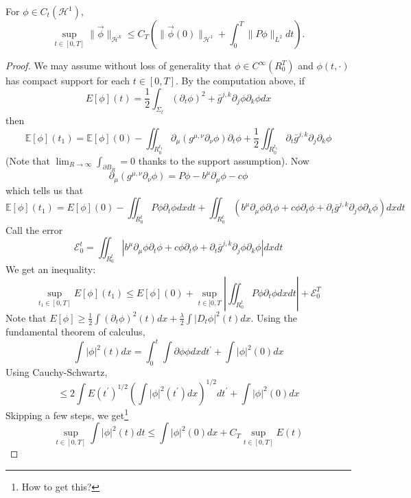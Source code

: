 \begin{lemma}
 For $\phi \in C_{t}\left(\mathcal{H}^{1}\right)$,
$$
\sup _{t \in[0, T]}\|\vec{\phi}\|_{\mathcal{H}^{k}} \leq C_{T}\left(\|\vec{\phi}(0)\|_{\mathcal{H}^{1}}+\int_{0}^{T}\|P \phi\|_{L^{2}} d t\right) .
$$

\end{lemma}
\begin{proof}
    We may assume without loss of generality that $\phi \in C^{\infty}\left(R_{0}^{T}\right)$ and $\phi(t, \cdot)$ has compact support for each $t \in[0, T]$. By the computation above, if
    $$
    E[\phi](t)=\frac{1}{2} \int_{\Sigma_{t}}\left(\partial_{t} \phi\right)^{2}+\bar{g}^{j, k} \partial_{j} \phi \partial_{k} \phi d x
    $$
    then
    $$
    \mathbb{E}[\phi]\left(t_{1}\right)=\mathbb{E}[\phi](0)-\iint_{R_{0}^{t_{1}}} \partial_{\mu}\left(g^{\mu, \nu} \partial_{\nu} \phi\right)\partial_t \phi+\frac{1}{2} \iint_{R_{0}^{t_{1}}} \partial_{t} \bar{g}^{j, k} \partial_{j} \partial_{k} \phi
    $$
    (Note that $\lim _{R \rightarrow \infty} \int_{\partial B_{R}}=0$ thanks to the support assumption). Now
    $$
    \partial_{\mu}\left(g^{\mu, \nu} \partial_{\nu} \phi\right)=P \phi-b^{\mu} \partial_{\mu} \phi-c \phi
    $$
    which tells us that
    $$
    \mathbb{E}[\phi]\left(t_{1}\right)=E[\phi](0)-\iint_{R_{0}^{t}} P \phi \partial_{t} \phi d x d t+\iint_{R_{0}^{t}}\left(b^{\mu} \partial_{\mu} \phi \partial_{t} \phi+c \phi \partial_{t} \phi+\partial_{t} \bar{g}^{j, k} \partial_{j} \phi \partial_{k} \phi\right) d x d t
    $$
    Call the error
    $$
    \mathcal{E}_{0}^{t}=\iint_{R_{0}^{t}}\left|b^{\mu} \partial_{\mu} \phi \partial_{t} \phi+c \phi \partial_{t} \phi+\partial_{t} \bar{g}^{j, k} \partial_{j} \phi \partial_{k} \phi\right| d x d t
    $$
    We get an inequality:
    $$
    \sup _{t_{1} \in[0, T]} E[\phi]\left(t_{1}\right) \leq E[\phi](0)+\sup _{t \in[0, T}\left|\iint_{R_{0}^{t}} P \phi \partial_{t} \phi d x d t\right|+\mathcal{E}_{0}^{T}
    $$
    Note that $E[\phi] \geq \frac{1}{2} \int\left(\partial_{t} \phi\right)^{2}(t) d x + \frac{\lambda}{2} \int\left|D_{t} \phi\right|^{2}(t) d x$. Using the fundamental theorem of calculus,
    $$
    \int|\phi|^{2}(t) d x=\int_{0}^{t} \int \partial \phi \phi d x d t^{\prime}+\int|\phi|^{2}(0) d x
    $$
    Using Cauchy-Schwartz,
$$
\leq 2 \int E\left(t^{\prime}\right)^{1 / 2}\left(\int|\phi|^{2}\left(t^{\prime}\right) d x\right)^{1 / 2} d t^{\prime}+\int|\phi|^{2}(0) d x
$$
Skipping a few steps, we get\footnote{How to get this?}
$$
\sup _{t \in[0, T]} \int|\phi|^{2}(t) d t \leq \int|\phi|^{2}(0) d x+C_T \sup _{t \in[0, T]} E(t)
$$
\end{proof}
